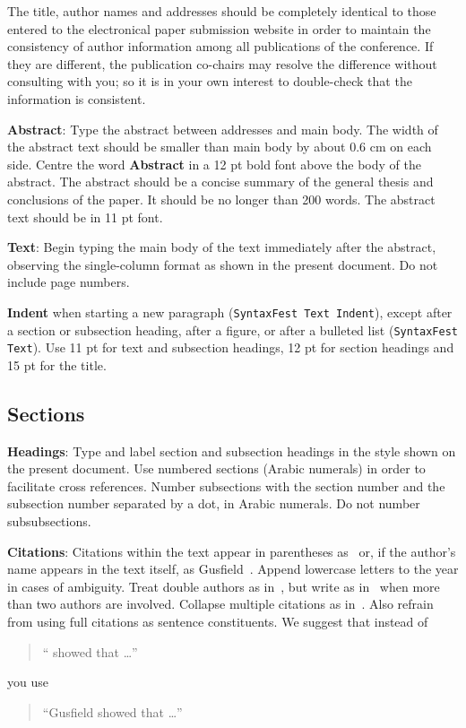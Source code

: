 \documentclass[11pt]{article}
\begin{document}
The title, author names and addresses should be completely identical to those entered to the electronical paper submission website in order to maintain the consistency of author information among all publications of the conference. If they are different, the publication co-chairs may resolve the difference without consulting with you; so it is in your own interest to double-check that the information is consistent.

{\bf Abstract}: Type the abstract between addresses and main body. The width of the abstract text should be smaller than main body by about 0.6 cm on each side. Centre the word {\bf Abstract} in a 12 pt bold font above the body of the abstract. The abstract should be a concise summary of the general thesis and conclusions of the paper. It should be no longer than 200 words. The abstract text should be in 11 pt font.

{\bf Text}: Begin typing the main body of the text immediately after the abstract, observing the single-column format as shown in the present document. Do not include page numbers.

{\bf Indent} when starting a new paragraph ({\tt SyntaxFest Text Indent}), except after a section or subsection heading, after a figure, or after a bulleted list ({\tt SyntaxFest Text}).  Use 11 pt for text and subsection headings, 12 pt for section headings and 15 pt for the title. 


\subsection{Sections}

{\bf Headings}: Type and label section and subsection headings in the style shown on the present document. Use numbered sections (Arabic numerals) in order to facilitate cross references. Number subsections with the section number and the subsection number separated by a dot, in Arabic numerals. Do not number subsubsections.

{\bf Citations}: Citations within the text appear in parentheses
as~\cite{Gusfield:97} or, if the author's name appears in the text itself, as Gusfield~. Append lowercase letters to the year in cases of ambiguity. Treat double authors as in~\cite{Aho:72}, but write as in~\cite{Chandra:81} when more than two authors are involved. Collapse multiple citations as in~\cite{Gusfield:97,Aho:72}. Also refrain from using full citations as sentence constituents. We suggest that instead of
\begin{quote}
  ``\cite{Gusfield:97} showed that \ldots''
\end{quote}
you use
\begin{quote}
``Gusfield    showed that \ldots''
\end{quote}
\end{document}
